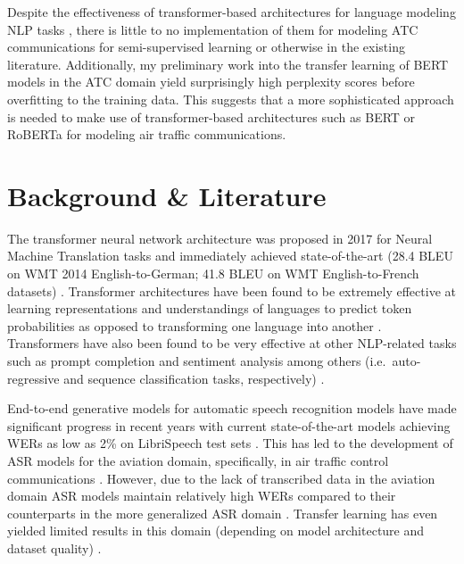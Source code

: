 \documentclass[10pt]{article}
\begin{document}
        Despite the effectiveness of transformer-based architectures for language modeling NLP tasks
        \cite{devlin_bert_2019,lewis_bart_2019,liu_roberta_2019}, there is little to no implementation
        of them for modeling ATC communications for semi-supervised learning or otherwise in the
        existing literature.
        Additionally, my preliminary work into the transfer learning of BERT models in the ATC
        domain yield surprisingly high perplexity scores before overfitting to the training data.
        This suggests that a more sophisticated approach is needed to make use of transformer-based
        architectures such as BERT or RoBERTa for modeling air traffic communications.

    \section{Background \& Literature}
        The transformer neural network architecture was proposed in 2017 for Neural Machine Translation tasks and immediately achieved
        state-of-the-art (28.4 BLEU on WMT 2014 English-to-German; 41.8 BLEU on WMT English-to-French datasets)
        \cite{vaswani_attention_2017}. Transformer architectures have been found to be extremely effective at learning representations
        and understandings of languages to predict token probabilities as opposed to transforming one language into another
        \cite{devlin_bert_2019,liu_roberta_2019}. Transformers have also been found to be very effective at
        other NLP-related tasks such as prompt completion and sentiment analysis among others (i.e.~auto-regressive and sequence
        classification tasks, respectively) \cite{lewis_bart_2019,radford_improving_2018}.


        End-to-end generative models for automatic speech recognition models have made significant progress in recent years with
        current state-of-the-art models achieving WERs as low as 2\% on LibriSpeech test sets
        \cite{han_contextnet_2020,kriman_quartznet_2020,baevski_wav2vec_2020,li_jasper_2019}. This has led to the development of ASR
        models for the aviation domain, specifically, in air traffic control communications
        \cite{badrinath_automatic_2022,smidl_air_2019,zuluaga-gomez_automatic_2020,srinivasamurthy_semi-supervised_2017}.
        However, due to the lack of transcribed data in the aviation domain
        \cite{zuluaga-gomez_automatic_2020,srinivasamurthy_semi-supervised_2017,badrinath_automatic_2022,smidl_air_2019}
        ASR models maintain relatively high WERs compared to their counterparts in the more generalized ASR domain
        \cite{zuluaga-gomez_automatic_2020,badrinath_automatic_2022}. Transfer learning has even yielded limited results
        in this domain (depending on model architecture and dataset quality)
        \cite{badrinath_automatic_2022,zuluaga-gomez_automatic_2020}.
\end{document}
